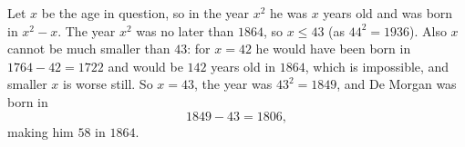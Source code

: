 Let $x$ be the age in question, so in the year $x^2$ he was $x$ years old and was born in $x^2-x$. The year $x^2$ was no later than $1864$, so $x\le43$ (as $44^2=1936$). Also $x$ cannot be much smaller than $43$: for $x=42$ he would have been born in $1764-42=1722$ and would be $142$ years old in $1864$, which is impossible, and smaller $x$ is worse still. So $x=43$, the year was $43^2=1849$, and De Morgan was born in
\[1849-43=\boxed{1806},\]
making him $58$ in $1864$.
